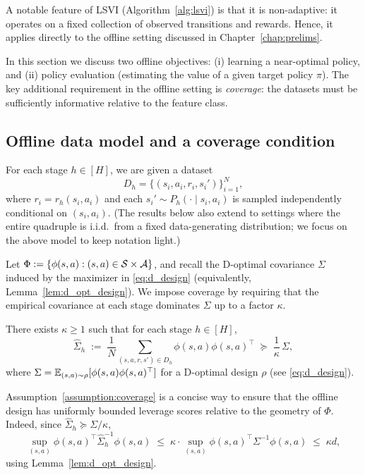 A notable feature of LSVI (Algorithm~\ref{alg:lsvi}) is that it is non-adaptive:
it operates on a fixed collection of observed transitions and rewards. Hence, it
applies directly to the offline setting discussed in Chapter~\ref{chap:prelims}.

In this section we discuss two offline objectives:
(i) learning a near-optimal policy, and
(ii) policy evaluation (estimating the value of a given target policy $\pi$).
The key additional requirement in the offline setting is \emph{coverage}: the
datasets must be sufficiently informative relative to the feature class.

\subsection{Offline data model and a coverage condition}
\label{subsec:BC_offline_setup}

For each stage $h\in[H]$, we are given a dataset
\[
D_h=\{(s_i,a_i,r_i,s_i')\}_{i=1}^N,
\]
where $r_i=r_h(s_i,a_i)$ and each $s_i'\sim P_h(\cdot\mid s_i,a_i)$ is sampled
independently conditional on $(s_i,a_i)$. (The results below also extend to
settings where the entire quadruple is i.i.d.\ from a fixed data-generating
distribution; we focus on the above model to keep notation light.)

Let $\Phi:=\{\phi(s,a):(s,a)\in\mathcal{S}\times\mathcal{A}\}$, and recall the D-optimal
covariance $\Sigma$ induced by the maximizer in \eqref{eq:d_design} (equivalently,
Lemma~\ref{lem:d_opt_design}). We impose coverage by requiring that the empirical
covariance at each stage dominates $\Sigma$ up to a factor $\kappa$.

\begin{assumption}[Coverage]\label{assumption:coverage}
There exists $\kappa\ge 1$ such that for each stage $h\in[H]$,
\[
\widehat\Sigma_h
\;:=\;
\frac{1}{N}\sum_{(s,a,r,s')\in D_h}\phi(s,a)\phi(s,a)^\top
\;\succeq\;
\frac{1}{\kappa}\,\Sigma,
\]
where $\Sigma=\mathbb{E}_{(s,a)\sim\rho}[\phi(s,a)\phi(s,a)^\top]$ for a D-optimal design
$\rho$ (see \eqref{eq:d_design}).
\end{assumption}

Assumption~\ref{assumption:coverage} is a concise way to ensure that the offline
design has uniformly bounded leverage scores relative to the geometry of $\Phi$.
Indeed, since $\widehat\Sigma_h\succeq \Sigma/\kappa$,
\[
\sup_{(s,a)}\phi(s,a)^\top \widehat\Sigma_h^{-1}\phi(s,a)
\;\le\;
\kappa\cdot \sup_{(s,a)}\phi(s,a)^\top \Sigma^{-1}\phi(s,a)
\;\le\;
\kappa d,
\]
using Lemma~\ref{lem:d_opt_design}.

